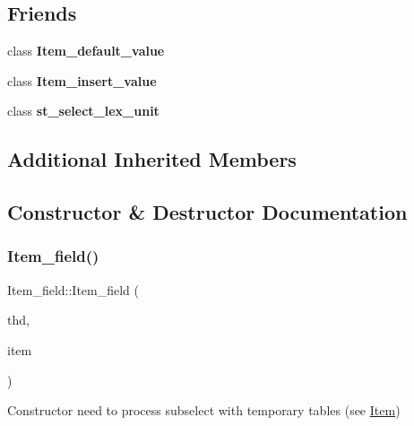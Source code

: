 \subsection*{Friends}
\begin{DoxyCompactItemize}
\item 
\mbox{\label{classItem__field_a3d2b401284a4cf03099d80692a0b7415}} 
class {\bfseries Item\+\_\+default\+\_\+value}
\item 
\mbox{\label{classItem__field_af7b005edd4d9ad74dae61b6826b6e898}} 
class {\bfseries Item\+\_\+insert\+\_\+value}
\item 
\mbox{\label{classItem__field_ab81fc828759467148e61bea2a5e9c500}} 
class {\bfseries st\+\_\+select\+\_\+lex\+\_\+unit}
\end{DoxyCompactItemize}
\subsection*{Additional Inherited Members}


\subsection{Constructor \& Destructor Documentation}
\mbox{\label{classItem__field_a7ba647131cd5b596fe202de4cf31e64f}} 
\subsubsection{\texorpdfstring{Item\+\_\+field()}{Item\_field()}\hspace{0.1cm}{\footnotesize\ttfamily [1/2]}}
{\footnotesize\ttfamily Item\+\_\+field\+::\+Item\+\_\+field (\begin{DoxyParamCaption}\item[{T\+HD $\ast$}]{thd,  }\item[{\mbox{\hyperlink{classItem__field}{Item\+\_\+field}} $\ast$}]{item }\end{DoxyParamCaption})}

Constructor need to process subselect with temporary tables (see \mbox{\hyperlink{classItem}{Item}}) \mbox{\label{classItem__field_ada754f3ad660c242d38db725bf33a7de}} 
